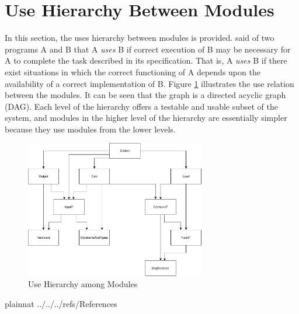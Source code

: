 \documentclass[12pt]{article}
\begin{document}
\section{Use Hierarchy Between Modules} \label{SecUse}

In this section, the uses hierarchy between modules is
provided. \citet{Parnas1978} said of two programs A and B that A {\em uses} B if
correct execution of B may be necessary for A to complete the task described in
its specification. That is, A {\em uses} B if there exist situations in which
the correct functioning of A depends upon the availability of a correct
implementation of B.  Figure \ref{FigUH} illustrates the use relation between
the modules. It can be seen that the graph is a directed acyclic graph
(DAG). Each level of the hierarchy offers a testable and usable subset of the
system, and modules in the higher level of the hierarchy are essentially simpler
because they use modules from the lower levels.

\begin{figure}[H]
	\centering
	\includegraphics[width=0.7\textwidth]{GlassBR-UsesHierarchy-FunctT.pdf}
	\caption{Use Hierarchy among Modules}
	\label{FigUH}
\end{figure}


 {plainnat}
 {../../../refs/References}
\end{document}
